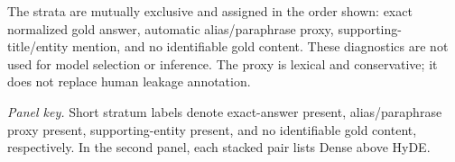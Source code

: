 \begin{table}[htbp]
\begin{tablenotes}
\footnotesize
\item The strata are mutually exclusive and assigned in the order shown: exact normalized gold answer, automatic alias/paraphrase proxy, supporting-title/entity mention, and no identifiable gold content. These diagnostics are not used for model selection or inference. The proxy is lexical and conservative; it does not replace human leakage annotation.
\end{tablenotes}\par\smallskip\raggedright\emph{Panel key.} Short stratum labels denote exact-answer present, alias/paraphrase proxy present, supporting-entity present, and no identifiable gold content, respectively. In the second panel, each stacked pair lists Dense above HyDE.
\end{table}

